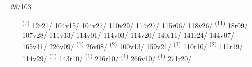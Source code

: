 \ENTRYEND
\noindent{} · \textit{28}/103 \LEMMALINE
\begin{description}
    \item[]  \textsuperscript{(7)} \mbox{12r21/} \mbox{104v15/} \mbox{104v27/} \mbox{110v29/} \mbox{114r27/} \mbox{115r06/} \mbox{118v26/} \textsuperscript{(11)} \mbox{18r09/} \mbox{107v28/} \mbox{111v13/} \mbox{114v01/} \mbox{114v03/} \mbox{114v20/} \mbox{140r11/} \mbox{141r24/} \mbox{144v07/} \mbox{165v11/} \mbox{226v09/} \textsuperscript{(1)} \mbox{26v08/} \textsuperscript{(2)} \mbox{100v13/} \mbox{159v21/} \textsuperscript{(1)} \mbox{110r10/} \textsuperscript{(2)} \mbox{111r19/} \mbox{114v29/} \textsuperscript{(1)} \mbox{143r10/} \textsuperscript{(1)} \mbox{216r10/} \textsuperscript{(1)} \mbox{266v10/} \textsuperscript{(1)} \mbox{271r20/}
\end{description}
\ENTRYEND
